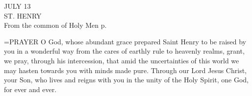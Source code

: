 \begin{center}\normalsize JULY 13\\
\footnotesize ST. HENRY\\
\footnotesize From the common of Holy Men p. \\
\end{center}

\hangindent=\parindent \small{PRAYER 
O God, whose abundant grace prepared Saint Henry
to be raised by you in a wonderful way
from the cares of earthly rule to heavenly realms,
grant, we pray, through his intercession,
that amid the uncertainties of this world
we may hasten towards you with minds made pure.
Through our Lord Jesus Christ, your Son,
who lives and reigns with you in the unity of the Holy Spirit,
one God, for ever and ever.\\}
 
